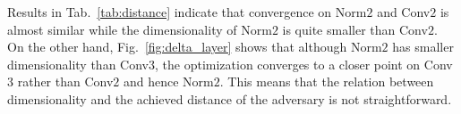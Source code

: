 \documentclass{article} %
\begin{document}
Results in Tab.~\ref{tab:distance} indicate that convergence on Norm$2$ and
Conv$2$ is almost similar while the dimensionality of Norm$2$ is quite smaller
than Conv$2$. On the other hand, Fig.~\ref{fig:delta_layer} shows that although
Norm$2$ has smaller dimensionality than Conv$3$,  the optimization converges to
a closer point on Conv$3$ rather than Conv$2$ and hence Norm$2$.  This means
that the relation between dimensionality and the achieved distance of the
adversary is not straightforward.


\begin{table*}[h!]
\end{table*}
\end{document}
